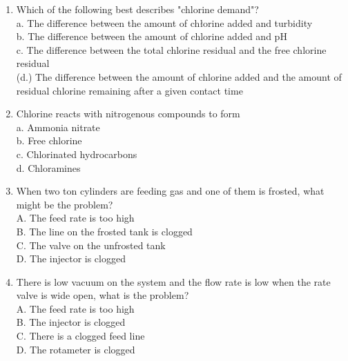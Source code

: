 \begin{enumerate}
\item Which of the following best describes "chlorine demand"?\\
a. The difference between the amount of chłorine added and turbidity\\
b. The difference between the amount of chlorine added and $\mathrm{pH}$\\
c. The difference between the total chlorine residual and the free chlorine residual\\
(d.) The difference between the amount of chlorine added and the amount of residual chlorine remaining after a given contact time\\


\item Chlorine reacts with nitrogenous compounds to form\\
a. Ammonia nitrate\\
b. Free chlorine\\
c. Chlorinated hydrocarbons\\
d. Chloramines\\

\item When two ton cylinders are feeding gas and one of them is frosted, what might be the problem?\\
A. The feed rate is too high\\
B. The line on the frosted tank is clogged\\
C. The valve on the unfrosted tank\\
D. The injector is clogged\\

\item There is low vacuum on the system and the flow rate is low when the rate valve is wide open, what is the problem?\\
A. The feed rate is too high\\
B. The injector is clogged\\
C. There is a clogged feed line\\
D. The rotameter is clogged\\



\end{enumerate}
\newpage

